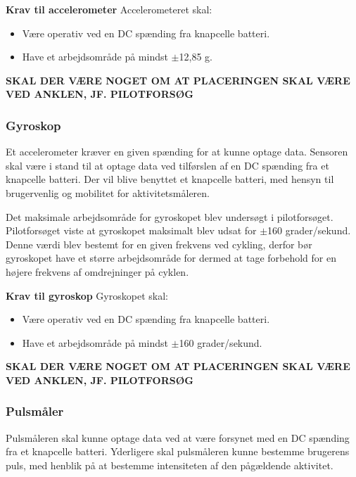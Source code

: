 \textbf{Krav til accelerometer} \newline 
Accelerometeret skal:
\begin{itemize}
\item Være operativ ved en DC spænding fra knapcelle batteri.
\item Have et arbejdsområde på mindst $\pm$12,85 g.
\end{itemize}

\textbf{SKAL DER VÆRE NOGET OM AT PLACERINGEN SKAL VÆRE VED ANKLEN, JF. PILOTFORSØG}

\subsubsection{Gyroskop} 
Et accelerometer kræver en given spænding for at kunne optage data. Sensoren skal være i stand til at optage data ved tilførslen af en DC spænding fra et knapcelle batteri. Der vil blive benyttet et knapcelle batteri, med hensyn til brugervenlig og mobilitet for aktivitetsmåleren.\newline

Det maksimale arbejdsområde for gyroskopet blev undersøgt i pilotforsøget. Pilotforsøget viste at gyroskopet maksimalt blev udsat for $\pm$160 grader/sekund. Denne værdi blev bestemt for en given frekvens ved cykling, derfor bør gyroskopet have et større arbejdsområde for dermed at tage forbehold for en højere frekvens af omdrejninger på cyklen. 


\textbf{Krav til gyroskop} \newline
Gyroskopet skal:
\begin{itemize}
\item Være operativ ved en DC spænding fra knapcelle batteri.
\item Have et arbejdsområde på mindst $\pm$160 grader/sekund.
\end{itemize}

\textbf{SKAL DER VÆRE NOGET OM AT PLACERINGEN SKAL VÆRE VED ANKLEN, JF. PILOTFORSØG}

\subsubsection{Pulsmåler}
Pulsmåleren skal kunne optage data ved at være forsynet med en DC spænding fra et knapcelle batteri. \newline
Yderligere skal pulsmåleren kunne bestemme brugerens puls, med henblik på at bestemme intensiteten af den pågældende aktivitet.

